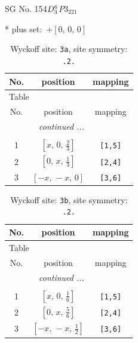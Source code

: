 \documentclass[fleqn,8pt]{jsarticle}
\begin{document}
\setcounter{MaxMatrixCols}{32}

\renewcommand{\tablename}{Table~}
\renewcommand{\figurename}{Figure~}
\begin{center}
\LARGE
SG No. 154\quad$D_{\rm 3}^{6}$\quad$P3_221$\quad[ trigonal ]
\end{center}
* plus set:\,\,\,$+\left[ 0,\, 0,\, 0 \right]$
\renewcommand{\arraystretch}{1.2}
\begin{longtable}{ccc}
\caption{Wyckoff site: {\tt 3a}, site symmetry: {\tt .2.}}
 \\
 \hline \hline
No. & position & mapping \\ \hline \endfirsthead

\multicolumn{2}{l}{\tablename\ \thetable{}} \\
 \hline \hline
No. & position & mapping \\ \hline \endhead

 \hline \hline
\multicolumn{2}{r}{\footnotesize\it continued ...} \\ \endfoot

 \hline \hline
\multicolumn{2}{r}{} \\ \endlastfoot

1 & $\left[ x,\, 0,\, \frac{2}{3} \right]$ & {\tt [1,5]} \\ \hline
2 & $\left[ 0,\, x,\, \frac{1}{3} \right]$ & {\tt [2,4]} \\ \hline
3 & $\left[ - x,\, - x,\, 0 \right]$ & {\tt [3,6]} \\
\end{longtable}
\renewcommand{\arraystretch}{1.2}
\begin{longtable}{ccc}
\caption{Wyckoff site: {\tt 3b}, site symmetry: {\tt .2.}}
 \\
 \hline \hline
No. & position & mapping \\ \hline \endfirsthead

\multicolumn{2}{l}{\tablename\ \thetable{}} \\
 \hline \hline
No. & position & mapping \\ \hline \endhead

 \hline \hline
\multicolumn{2}{r}{\footnotesize\it continued ...} \\ \endfoot

 \hline \hline
\multicolumn{2}{r}{} \\ \endlastfoot

1 & $\left[ x,\, 0,\, \frac{1}{6} \right]$ & {\tt [1,5]} \\ \hline
2 & $\left[ 0,\, x,\, \frac{5}{6} \right]$ & {\tt [2,4]} \\ \hline
3 & $\left[ - x,\, - x,\, \frac{1}{2} \right]$ & {\tt [3,6]} \\
\end{longtable}
\end{document}
